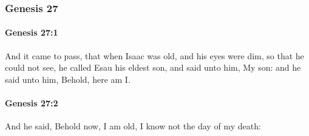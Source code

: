 	\subsubsection{Genesis 27} %
		\label{GENESIS-27}

		\paragraph{Genesis 27:1} %
			\label{GENESIS-27-1}

			And it came to pass, that when Isaac was old, and his eyes were dim, so that he could not see, he called Esau his eldest son, and said unto him, My son: and he said unto him, Behold, here am I.


		\paragraph{Genesis 27:2} %
			\label{GENESIS-27-2}

			And he said, Behold now, I am old, I know not the day of my death:

